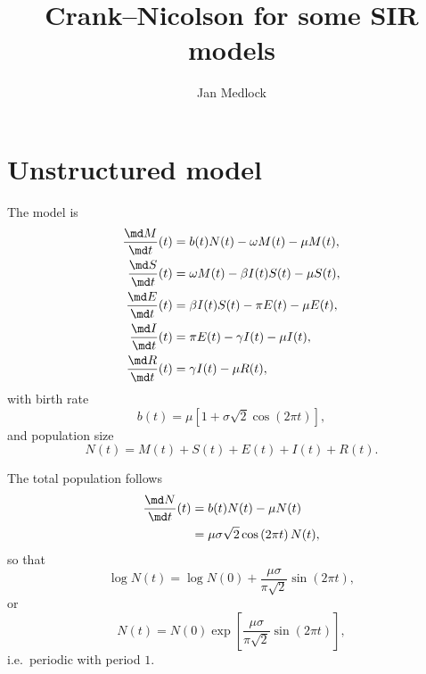 \documentclass{jpmarticle}
\title{Crank--Nicolson for some SIR models}
\author{Jan Medlock}
\begin{document}
\maketitle

\section{Unstructured model}

The model is
\begin{equation}
  \label{model_unstructured}
  \begin{split}
    \frac{\md M}{\md t}(t) &=
    b(t) N(t) - \omega M(t) - \mu M(t),
    \\
    \frac{\md S}{\md t}(t) &=
    \omega M(t) - \beta I(t) S(t) - \mu S(t),
    \\
    \frac{\md E}{\md t}(t) &=
    \beta I(t) S(t) - \pi E(t) - \mu E(t),
    \\
    \frac{\md I}{\md t}(t) &=
    \pi E(t) - \gamma I(t) - \mu I(t),
    \\
    \frac{\md R}{\md t}(t) &=
    \gamma I(t) - \mu R(t),
  \end{split}
\end{equation}
with birth rate
\begin{equation}
  b(t) = \mu \left[
    1 + \sigma \sqrt{2} \cos\left(2 \pi t\right)
  \right],
\end{equation}
and population size
\begin{equation}
  N(t) = M(t) + S(t) + E(t) + I(t) + R(t).
\end{equation}

The total population follows
\begin{equation}
  \begin{split}
    \frac{\md N}{\md t}(t)
    &= b(t) N(t) - \mu N(t)
    \\
    &= \mu \sigma \sqrt{2} \cos\left(2 \pi t\right) N(t),
  \end{split}
\end{equation}
so that
\begin{equation}
  \log N(t) = \log N(0)
  + \frac{\mu \sigma}{\pi \sqrt{2}}
  \sin\left(2 \pi t\right),
\end{equation}
or
\begin{equation}
  N(t) = N(0) \exp\left[
    \frac{\mu \sigma}{\pi \sqrt{2}}
    \sin\left(2 \pi t\right)
  \right],
\end{equation}
i.e.~periodic with period $1$.
\end{document}
